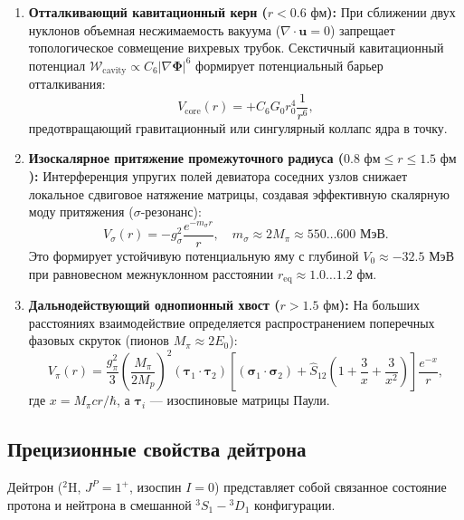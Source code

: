 \documentclass[11pt,a4paper]{article}
\theoremstyle{definition}
\theoremstyle{remark}
\begin{document}
\begin{enumerate}
    \item \textbf{Отталкивающий кавитационный керн ($r < 0.6\text{ фм}$):}
    При сближении двух нуклонов объемная несжимаемость вакуума ($\nabla \cdot \mathbf{u} = 0$) запрещает топологическое совмещение вихревых трубок. Секстичный кавитационный потенциал $\mathcal{W}_{\mathrm{cavity}} \propto C_6 |\nabla \boldsymbol{\Phi}|^6$ формирует потенциальный барьер отталкивания:
    \begin{equation}
        V_{\mathrm{core}}(r) = + C_6 G_0 r_0^4 \frac{1}{r^6},
        \label{eq:v_core_repulsive}
    \end{equation}
    предотвращающий гравитационный или сингулярный коллапс ядра в точку.
    
    \item \textbf{Изоскалярное притяжение промежуточного радиуса ($0.8\text{ фм} \le r \le 1.5\text{ фм}$):}
    Интерференция упругих полей девиатора соседних узлов снижает локальное сдвиговое натяжение матрицы, создавая эффективную скалярную моду притяжения ($\sigma$-резонанс):
    \begin{equation}
        V_\sigma(r) = - g_\sigma^2 \frac{e^{-m_\sigma r}}{r}, \quad m_\sigma \approx 2 M_\pi \approx 550\dots 600\text{ МэВ}.
    \end{equation}
    Это формирует устойчивую потенциальную яму с глубиной $V_0 \approx -32.5\text{ МэВ}$ при равновесном межнуклонном расстоянии $r_{\mathrm{eq}} \approx 1.0\dots 1.2\text{ фм}$.
    
    \item \textbf{Дальнодействующий однопионный хвост ($r > 1.5\text{ фм}$):}
    На больших расстояниях взаимодействие определяется распространением поперечных фазовых скруток (пионов $M_\pi \approx 2E_0$):
    \begin{equation}
        V_\pi(r) = \frac{g_\pi^2}{3} \left(\frac{M_\pi}{2M_p}\right)^2 (\boldsymbol{\tau}_1 \cdot \boldsymbol{\tau}_2) \left[ (\boldsymbol{\sigma}_1 \cdot \boldsymbol{\sigma}_2) + \hat{S}_{12} \left( 1 + \frac{3}{x} + \frac{3}{x^2} \right) \right] \frac{e^{-x}}{r},
    \end{equation}
    где $x = M_\pi c r / \hbar$, а $\boldsymbol{\tau}_i$ --- изоспиновые матрицы Паули.
\end{enumerate}

\subsection{Прецизионные свойства дейтрона}
Дейтрон ($^2\mathrm{H}$, $J^P = 1^+$, изоспин $I=0$) представляет собой связанное состояние протона и нейтрона в смешанной $^3S_1 - {^3D_1}$ конфигурации.
\end{document}
